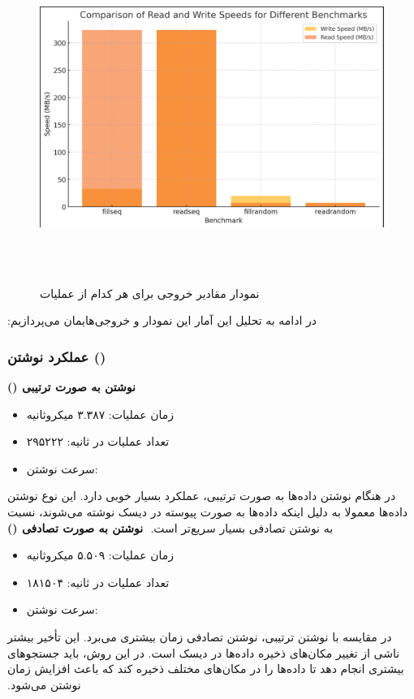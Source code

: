 ‫
‫\begin{figure}[H]
‫    \centering
‫    \includegraphics[width=\textwidth]{figs/10.png}
‫    \caption{نمودار مقادیر خروجی برای هر کدام از عملیات}
‫\end{figure}
‫
‫در ادامه به تحلیل این آمار این نمودار و خروجی‌هایمان می‌پردازیم:
‫
‫\subsubsection*{عملکرد نوشتن ()}
‫
‫\textbf{نوشتن به صورت ترتیبی ()}
‫\begin{itemize}
‫    \item زمان عملیات: ۳.۳۸۷ میکروثانیه
‫    \item تعداد عملیات در ثانیه: ۲۹۵۲۲۲
‫    \item سرعت نوشتن: 
‫\end{itemize}
‫
‫در هنگام نوشتن داده‌ها به صورت ترتیبی،  عملکرد بسیار خوبی دارد. این نوع نوشتن داده‌ها معمولا به دلیل اینکه داده‌ها به صورت پیوسته در دیسک نوشته می‌شوند، نسبت به نوشتن تصادفی بسیار سریع‌تر است.
‫
‫\textbf{نوشتن به صورت تصادفی ()}
‫\begin{itemize}
‫    \item زمان عملیات: ۵.۵۰۹ میکروثانیه
‫    \item تعداد عملیات در ثانیه: ۱۸۱۵۰۴
‫    \item سرعت نوشتن: 
‫\end{itemize}
‫
‫در مقایسه با نوشتن ترتیبی، نوشتن تصادفی زمان بیشتری می‌برد. این تأخیر بیشتر ناشی از تغییر مکان‌های ذخیره داده‌ها در دیسک است. در این روش،  باید جستجوهای بیشتری انجام دهد تا داده‌ها را در مکان‌های مختلف ذخیره کند که باعث افزایش زمان نوشتن می‌شود.
